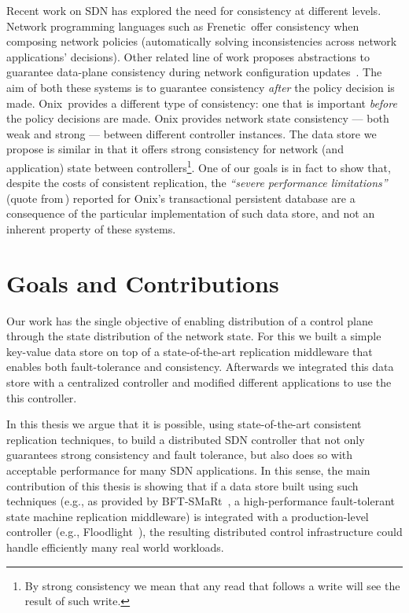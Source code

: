 Recent work on SDN has explored the need for consistency at different levels. 
Network programming languages such as Frenetic\,\cite{Foster2011} offer consistency when composing network policies (automatically solving inconsistencies across network applications' decisions). 
Other related line of work proposes abstractions to guarantee data-plane consistency during network configuration updates~\cite{reitblatt2012abstractions}. 
The aim of both these systems is to guarantee consistency \textit{after} the policy decision is made. 
Onix\,\cite{koponen2010} provides a different type of consistency: one that is important \emph{before} the policy decisions are made. 
Onix provides network state consistency --- both weak and strong --- between different controller instances. 
The data store we propose is similar in that it offers strong consistency for network (and application) state between controllers\footnote{By strong consistency we mean that any read that follows a write will see the result of such write.}. 
One of our goals is in fact to show that, despite the costs of consistent replication, the \emph{``severe performance limitations''} (quote from\,\cite{koponen2010}) reported for Onix's transactional persistent database are a consequence of the particular implementation of such data store, and not an inherent property of these systems. 


\section{Goals and Contributions}

Our work has the single objective of enabling distribution of a control plane through the state distribution of the network state. 
For this we built a simple key-value data store on top of a state-of-the-art replication middleware that enables both fault-tolerance and consistency. 
Afterwards we integrated this data store with a centralized controller and modified different applications to use the this controller. 

In this thesis we argue that it is possible, using state-of-the-art consistent replication techniques, to build a distributed SDN controller that not only guarantees strong consistency and fault tolerance, but also does so with acceptable performance for many SDN applications.
In this sense, the main contribution of this thesis is showing that if a data store built using such techniques (e.g., as provided by BFT-SMaRt~\cite{smart-tr, bft-smart:2011:High-perfomance}, a high-performance fault-tolerant state machine replication middleware) is integrated with a production-level controller (e.g., Floodlight~\cite{flood}), the resulting distributed control infrastructure could handle efficiently many real world workloads.

